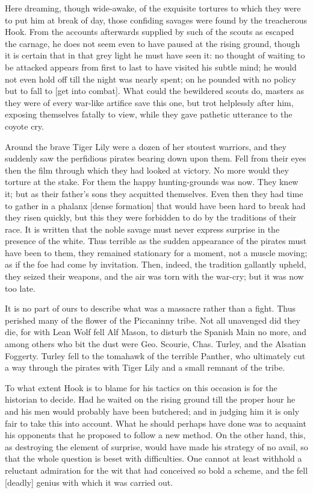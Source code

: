 Here dreaming, though wide-awake, of the exquisite tortures to which they
were to put him at break of day, those confiding savages were found by the
treacherous Hook. From the accounts afterwards supplied by such of the
scouts as escaped the carnage, he does not seem even to have paused at the
rising ground, though it is certain that in that grey light he must have
seen it: no thought of waiting to be attacked appears from first to last
to have visited his subtle mind; he would not even hold off till the night
was nearly spent; on he pounded with no policy but to fall to [get into
combat]. What could the bewildered scouts do, masters as they were of
every war-like artifice save this one, but trot helplessly after him,
exposing themselves fatally to view, while they gave pathetic utterance to
the coyote cry.


Around the brave Tiger Lily were a dozen of her stoutest warriors, and
they suddenly saw the perfidious pirates bearing down upon them. Fell from
their eyes then the film through which they had looked at victory. No more
would they torture at the stake. For them the happy hunting-grounds was
now. They knew it; but as their father's sons they acquitted themselves.
Even then they had time to gather in a phalanx [dense formation] that
would have been hard to break had they risen quickly, but this they were
forbidden to do by the traditions of their race. It is written that the
noble savage must never express surprise in the presence of the white.
Thus terrible as the sudden appearance of the pirates must have been to
them, they remained stationary for a moment, not a muscle moving; as if
the foe had come by invitation. Then, indeed, the tradition gallantly
upheld, they seized their weapons, and the air was torn with the war-cry;
but it was now too late.


It is no part of ours to describe what was a massacre rather than a fight.
Thus perished many of the flower of the Piccaninny tribe. Not all
unavenged did they die, for with Lean Wolf fell Alf Mason, to disturb the
Spanish Main no more, and among others who bit the dust were Geo. Scourie,
Chas. Turley, and the Alsatian Foggerty. Turley fell to the tomahawk of
the terrible Panther, who ultimately cut a way through the pirates with
Tiger Lily and a small remnant of the tribe.


To what extent Hook is to blame for his tactics on this occasion is for
the historian to decide. Had he waited on the rising ground till the
proper hour he and his men would probably have been butchered; and in
judging him it is only fair to take this into account. What he should
perhaps have done was to acquaint his opponents that he proposed to follow
a new method. On the other hand, this, as destroying the element of
surprise, would have made his strategy of no avail, so that the whole
question is beset with difficulties. One cannot at least withhold a
reluctant admiration for the wit that had conceived so bold a scheme, and
the fell [deadly] genius with which it was carried out.


